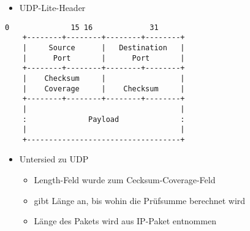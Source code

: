 \documentclass{beamer}
\begin{document}
\begin{frame}[fragile]
\begin{itemize}
\item UDP-Lite-Header
\end{itemize}
\begin{lstlisting}[linewidth=0.90\textwidth=small]
     0              15 16             31
    +--------+--------+--------+--------+
    |     Source      |   Destination   |
    |      Port       |      Port       |
    +--------+--------+--------+--------+
    |    Checksum     |                 |
    |    Coverage     |    Checksum     |
    +--------+--------+--------+--------+
    |                                   |
    :              Payload              :
    |                                   |
    +-----------------------------------+
\end{lstlisting}
\begin{itemize}
\item Untersied zu UDP
	\begin{itemize}
	\item Length-Feld wurde zum Cecksum-Coverage-Feld
	\item gibt Länge an, bis wohin die Prüfsumme berechnet wird
	\item Länge des Pakets wird aus IP-Paket entnommen
	\end{itemize}
\end{itemize}
\end{frame}

\end{document}
